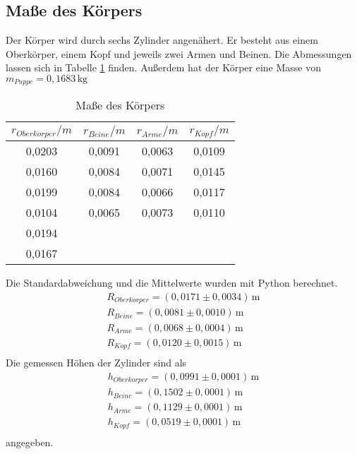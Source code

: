 \subsection{Maße des Körpers}
\label{sec:maskoerper}
Der Körper wird durch sechs Zylinder angenähert. Er besteht aus einem Oberkörper, einem Kopf und jeweils zwei Armen und Beinen.
Die Abmessungen lassen sich in Tabelle \ref{tab:r_Koerper} finden. Außerdem hat der Körper eine Masse von $m_{Puppe} = 0{,}1683\,\mathrm{kg}$
\begin{table}
  \centering
  \caption{Maße des Körpers}
  \label{tab:r_Koerper}
  \begin{tabular}{c c c c}
    \toprule
    $r_{Oberk\ddot{o}rper}/m$ & $r_{Beine}/m$ & $r_{Arme}/m$ & $r_{Kopf}/m$ \\
    \midrule
    0,0203 &  0,0091 &  0,0063 & 0,0109 \\
    0,0160 &  0,0084 &  0,0071 & 0,0145 \\
    0,0199 &  0,0084 &  0,0066 & 0,0117 \\
    0,0104 &  0,0065 &  0,0073 & 0,0110 \\
    0,0194 &         &         &        \\
    0,0167 &         &         &        \\
    \bottomrule
  \end{tabular}
\end{table}
Die Standardabweichung und die Mittelwerte wurden mit Python berechnet.
\begin{align*}
  R_{Oberk\ddot{o}rper}       = (0{,}0171 \pm 0{,}0034)\, \mathrm{m} \\
  R_{Beine}      = (0{,}0081 \pm 0{,}0010)\, \mathrm{m} \\
  R_{Arme}       = (0{,}0068 \pm 0{,}0004)\, \mathrm{m} \\
  R_{Kopf}       = (0{,}0120 \pm 0{,}0015)\, \mathrm{m} \\
\end{align*}
Die gemessen Höhen der Zylinder sind als
\begin{align*}
  h_{Oberk\ddot{o}rper}       = (0{,}0991 \pm 0{,}0001)\, \mathrm{m} \\
  h_{Beine}      = (0{,}1502 \pm 0{,}0001)\, \mathrm{m} \\
  h_{Arme}       = (0{,}1129 \pm 0{,}0001)\, \mathrm{m} \\
  h_{Kopf}       = (0{,}0519 \pm 0{,}0001)\, \mathrm{m} \\
\end{align*}
angegeben.

